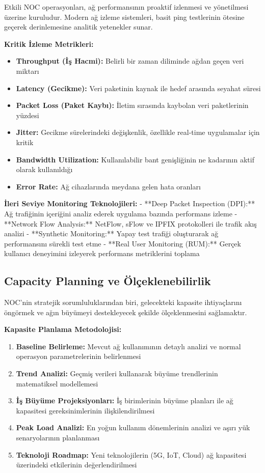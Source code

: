 Etkili NOC operasyonları, ağ performansının proaktif izlenmesi ve yönetilmesi üzerine kuruludur. Modern ağ izleme sistemleri, basit ping testlerinin ötesine geçerek derinlemesine analitik yetenekler sunar.

\textbf{Kritik İzleme Metrikleri:}
\begin{itemize}
    \item \textbf{Throughput (İş Hacmi):} Belirli bir zaman diliminde ağdan geçen veri miktarı
    \item \textbf{Latency (Gecikme):} Veri paketinin kaynak ile hedef arasında seyahat süresi  
    \item \textbf{Packet Loss (Paket Kaybı):} İletim sırasında kaybolan veri paketlerinin yüzdesi
    \item \textbf{Jitter:} Gecikme sürelerindeki değişkenlik, özellikle real-time uygulamalar için kritik
    \item \textbf{Bandwidth Utilization:} Kullanılabilir bant genişliğinin ne kadarının aktif olarak kullanıldığı
    \item \textbf{Error Rate:} Ağ cihazlarında meydana gelen hata oranları
\end{itemize}

\textbf{İleri Seviye Monitoring Teknolojileri:}
- **Deep Packet Inspection (DPI):** Ağ trafiğinin içeriğini analiz ederek uygulama bazında performans izleme
- **Network Flow Analysis:** NetFlow, sFlow ve IPFIX protokolleri ile trafik akış analizi
- **Synthetic Monitoring:** Yapay test trafiği oluşturarak ağ performansını sürekli test etme
- **Real User Monitoring (RUM):** Gerçek kullanıcı deneyimini izleyerek performans metriklerini toplama

\subsection{Capacity Planning ve Ölçeklenebilirlik}

NOC'nin stratejik sorumluluklarından biri, gelecekteki kapasite ihtiyaçlarını öngörmek ve ağın büyümeyi destekleyecek şekilde ölçeklenmesini sağlamaktır.

\textbf{Kapasite Planlama Metodolojisi:}
\begin{enumerate}
    \item \textbf{Baseline Belirleme:} Mevcut ağ kullanımının detaylı analizi ve normal operasyon parametrelerinin belirlenmesi
    \item \textbf{Trend Analizi:} Geçmiş verileri kullanarak büyüme trendlerinin matematiksel modellemesi
    \item \textbf{İş Büyüme Projeksiyonları:} İş birimlerinin büyüme planları ile ağ kapasitesi gereksinimlerinin ilişkilendirilmesi
    \item \textbf{Peak Load Analizi:} En yoğun kullanım dönemlerinin analizi ve aşırı yük senaryolarının planlanması
    \item \textbf{Teknoloji Roadmap:} Yeni teknolojilerin (5G, IoT, Cloud) ağ kapasitesi üzerindeki etkilerinin değerlendirilmesi
\end{enumerate}

